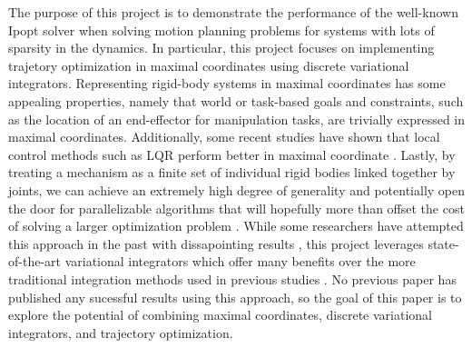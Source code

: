 \documentclass[conference]{IEEEtran}
\begin{document}

The purpose of this project is to demonstrate the performance of the well-known Ipopt solver
when solving motion planning problems for systems with lots of sparsity in the dynamics. 
In particular, this project focuses on implementing trajetory optimization in maximal 
coordinates using discrete variational integrators. Representing rigid-body systems in 
maximal coordinates has some appealing properties, namely that world or task-based goals 
and constraints, such as the location of an end-effector for manipulation tasks, are 
trivially expressed in maximal coordinates. Additionally, some recent studies have shown
that local control methods such as LQR perform better in maximal coordinate
\cite{brudigam_LinearTime_2020,brudigam2021linear}.  Lastly, by treating a 
mechanism as a finite set of individual rigid bodies linked together by joints, we can 
achieve an extremely high degree of generality and potentially open the door for 
parallelizable algorithms that will hopefully more than offset the cost of solving a larger
optimization problem \cite{baraff_Lineartime_1996}. While some researchers have attempted 
this approach in the past with
dissapointing results \cite{knemeyer2020minor,}, this project leverages state-of-the-art 
variational integrators 
which offer many benefits over the more traditional integration methods used in previous 
studies \cite{manchester_Variational_2017,brudigam_LinearTime_2020,marsden2001discrete}. 
No previous paper has published any sucessful results using this approach, so 
the goal of this paper is to explore the potential of combining maximal coordinates, 
discrete variational integrators, and trajectory optimization.
\end{document}
